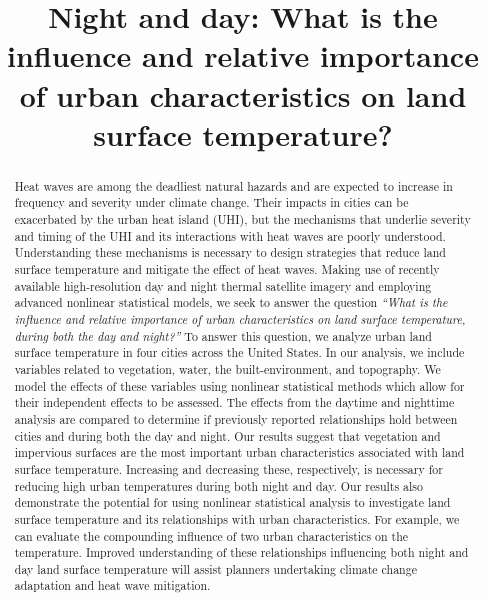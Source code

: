 \documentclass[review]{elsarticle}
\begin{document}
\begin{frontmatter}

\title{Night and day: What is the influence and relative importance of urban characteristics on land surface temperature?}




\begin{abstract}
Heat waves are among the deadliest natural hazards and are expected to increase in frequency and severity under climate change. 
Their impacts in cities can be exacerbated by the urban heat island (UHI), but the mechanisms that underlie severity and timing of the UHI and its interactions with heat waves are poorly understood.
Understanding these mechanisms is necessary to design strategies that reduce land surface temperature and mitigate the effect of heat waves.
Making use of recently available high-resolution day and night thermal satellite imagery and employing advanced nonlinear statistical models, we seek to answer the question \textit{``What is the influence and relative importance of urban characteristics on land surface temperature, during both the day and night?''} 
To answer this question, we analyze urban land surface temperature in four cities across the United States.
In our analysis, we include variables related to vegetation, water, the built-environment, and topography. 
We model the effects of these variables using nonlinear statistical methods which allow for their independent effects to be assessed.
The effects from the daytime and nighttime analysis are compared to determine if previously reported relationships hold between cities and during both the day and night.
Our results suggest that vegetation and impervious surfaces are the most important urban characteristics associated with land surface temperature.
Increasing and decreasing these, respectively, is necessary for reducing high urban temperatures during both night and day.
Our results also demonstrate the potential for using nonlinear statistical analysis to investigate land surface temperature and its relationships with urban characteristics. 
For example, we can evaluate the compounding influence of two urban characteristics on the temperature.
Improved understanding of these relationships influencing both night and day land surface temperature will assist planners undertaking climate change adaptation and heat wave mitigation.
\end{abstract}


\end{frontmatter}
\end{document}
